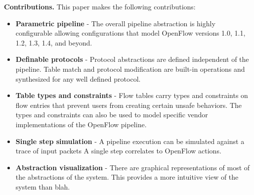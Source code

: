 
\textbf{Contributions.} This paper makes the following contributions:
\begin{itemize}
  \item \textbf{Parametric pipeline} - The overall pipeline abstraction is
        highly configurable allowing configurations that model OpenFlow 
        versions 1.0, 1.1, 1.2, 1.3, 1.4, and beyond.
  \item \textbf{Definable protocols} - Protocol abstractions are defined 
        independent of the pipeline. Table match and protocol modification are
        built-in operations and synthesized for any well defined protocol.
  \item \textbf{Table types and constraints} - Flow tables carry types and
        constraints on flow entries that prevent users from creating certain
        unsafe behaviors. The types and constraints can also be used to model
        specific vendor implementations of the OpenFlow pipeline.
  \item \textbf{Single step simulation} - A pipeline execution can be simulated
        against a trace of input packets A single step correlates to OpenFlow
        actions.
  \item \textbf{Abstraction visualization} - There are graphical representations
        of most of the abstractions of the system. This provides a more intuitive
        view of the system than blah.
\end{itemize}
